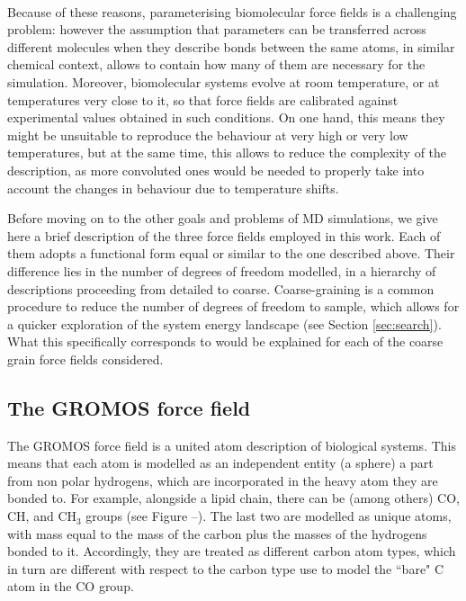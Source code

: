 \paragraph{} Because of these reasons, parameterising biomolecular force fields is a challenging problem: however the assumption that parameters can be transferred across different molecules when they describe bonds between the same atoms, in similar chemical context, allows to contain how many of them are necessary for the simulation.
%
Moreover, biomolecular systems evolve at room temperature, or at temperatures very close to it, so that force fields are calibrated against experimental values obtained in such conditions. On one hand, this means they might be unsuitable to reproduce the behaviour at very high or very low temperatures, but at the same time, this allows to reduce the complexity of the description, as more convoluted ones would be needed to properly take into account the changes in behaviour due to temperature shifts.

Before moving on to the other goals and problems of MD simulations, we give here a brief description of the three force fields employed in this work. Each of them adopts a functional form equal or similar to the one described above. Their difference lies in the number of degrees of freedom modelled, in a hierarchy of descriptions proceeding from detailed to coarse. Coarse-graining is a common procedure to reduce the number of degrees of freedom to sample, which allows for a quicker exploration of the system energy landscape (see Section \ref{sec:search}). What this specifically corresponds to would be explained for each of the coarse grain force fields considered.

\subsection{The GROMOS force field}
The GROMOS force field is a united atom description of biological systems. This means that each atom is modelled as an independent entity (a sphere) a part from non polar hydrogens, which are incorporated in the heavy atom they are bonded to. For example, alongside a lipid chain, there can be (among others) CO, CH, and CH$_3$ groups (see Figure --). The last two are modelled as unique atoms, with mass equal to the mass of the carbon plus the masses of the hydrogens bonded to it. Accordingly, they are treated as different carbon atom types, which in turn are different with respect to the carbon type use to model the ``bare" C atom in the CO group.

